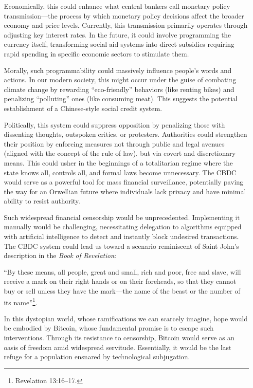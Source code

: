 \documentclass[
  a5paper,
  smalldemyvopaper,10pt,twoside,onecolumn,openright,extrafontsizes,hidelinks]{memoir}
\begin{document}
Economically, this could enhance what central bankers call monetary
policy transmission---the process by which monetary policy decisions
affect the broader economy and price levels. Currently, this
transmission primarily operates through adjusting key interest rates. In
the future, it could involve programming the currency itself,
transforming social aid systems into direct subsidies requiring rapid
spending in specific economic sectors to stimulate them.

Morally, such programmability could massively influence people's words
and actions. In our modern society, this might occur under the guise of
combating climate change by rewarding ``eco-friendly'' behaviors (like
renting bikes) and penalizing ``polluting'' ones (like consuming meat).
This suggests the potential establishment of a Chinese-style social
credit system.

Politically, this system could suppress opposition by penalizing those
with dissenting thoughts, outspoken critics, or protesters. Authorities
could strengthen their position by enforcing measures not through public
and legal avenues (aligned with the concept of the rule of law), but via
covert and discretionary means. This could usher in the beginnings of a
totalitarian regime where the state knows all, controls all, and formal
laws become unnecessary. The CBDC would serve as a powerful tool for
mass financial surveillance, potentially paving the way for an Orwellian
future where individuals lack privacy and have minimal ability to resist
authority.

Such widespread financial censorship would be unprecedented.
Implementing it manually would be challenging, necessitating delegation
to algorithms equipped with artificial intelligence to detect and
instantly block undesired transactions. The CBDC system could lead us
toward a scenario reminiscent of Saint John's description in the
\emph{Book of Revelation}:

``By these means, all people, great and small, rich and poor, free and
slave, will receive a mark on their right hands or on their foreheads,
so that they cannot buy or sell unless they have the mark---the name of
the beast or the number of its name''\footnote{Revelation 13:16--17.}.

In this dystopian world, whose ramifications we can scarcely imagine,
hope would be embodied by Bitcoin, whose fundamental promise is to
escape such interventions. Through its resistance to censorship, Bitcoin
would serve as an oasis of freedom amid widespread servitude.
Essentially, it would be the last refuge for a population ensnared by
technological subjugation.
\end{document}
